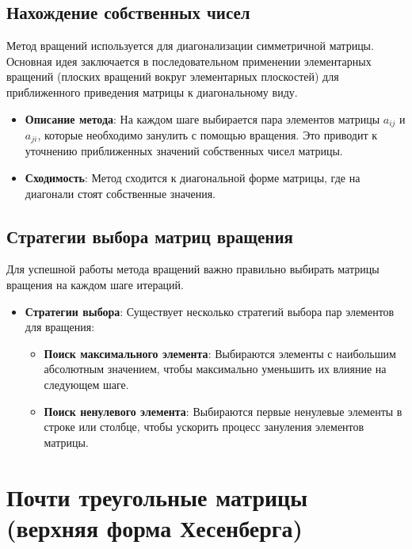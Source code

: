 \documentclass{article}
\begin{document}
\subsection{Нахождение собственных чисел}

Метод вращений используется для диагонализации симметричной матрицы. Основная идея заключается в последовательном применении элементарных вращений (плоских вращений вокруг элементарных плоскостей) для приближенного приведения матрицы к диагональному виду.

\begin{itemize}
  \item \textbf{Описание метода}: На каждом шаге выбирается пара элементов матрицы \( a_{ij} \) и \( a_{ji} \), которые необходимо занулить с помощью вращения. Это приводит к уточнению приближенных значений собственных чисел матрицы.
  
  \item \textbf{Сходимость}: Метод сходится к диагональной форме матрицы, где на диагонали стоят собственные значения.
\end{itemize}

\subsection{Стратегии выбора матриц вращения}

Для успешной работы метода вращений важно правильно выбирать матрицы вращения на каждом шаге итераций.

\begin{itemize}
  \item \textbf{Стратегии выбора}: Существует несколько стратегий выбора пар элементов для вращения:
    \begin{itemize}
      \item \textbf{Поиск максимального элемента}: Выбираются элементы с наибольшим абсолютным значением, чтобы максимально уменьшить их влияние на следующем шаге.
      \item \textbf{Поиск ненулевого элемента}: Выбираются первые ненулевые элементы в строке или столбце, чтобы ускорить процесс зануления элементов матрицы.
    \end{itemize}
\end{itemize}

\section{Почти треугольные матрицы (верхняя форма Хесенберга)}
\end{document}
